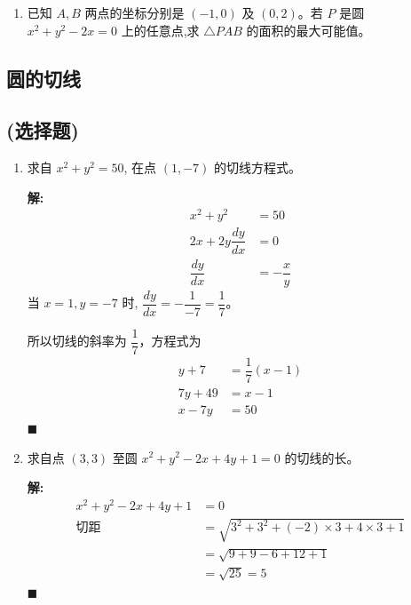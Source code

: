 \documentclass[10pt]{article}
\newcommand{\sol}{\textbf{解:} }
\begin{document}
\begin{enumerate}[leftmargin=*]
  \item 已知 $A, B$ 两点的坐标分别是 $(-1,0)$ 及 $(0,2)$。若 $P$ 是圆 $x^{2}+y^{2}-2 x=0$ 上的任意点,求 $\triangle P A B$ 的面积的最大可能值。

\end{enumerate}

\newpage
\subsection{圆的切线}
\subsection*{(选择题)}

\begin{enumerate}[leftmargin=*]
  \item 求自 $x^{2}+y^{2}=50$, 在点 $(1,-7)$ 的切线方程式。

        \sol{}
        \begin{align*}
          x^{2}+y^{2}          & = 50            \\
          2x+2y \dfrac{dy}{dx} & = 0             \\
          \dfrac{dy}{dx}       & = -\dfrac{x}{y}
        \end{align*}
        当 $x = 1, y = -7$ 时, $\dfrac{dy}{dx} = -\dfrac{1}{-7} = \dfrac{1}{7}$。

        所以切线的斜率为 $\dfrac{1}{7}$，方程式为
        \begin{align*}
          y+7     & = \dfrac{1}{7}(x-1) \\
          7y + 49 & = x - 1             \\
          x - 7y  & = 50
        \end{align*} \hfill$\blacksquare$

  \item 求自点 $(3,3)$ 至圆 $x^{2}+y^{2}-2 x+4 y+1=0$ 的切线的长。

        \sol{}
        \begin{align*}
          x^{2}+y^{2}-2 x+4 y+1 & = 0                                                 \\
          \text{切距}             & = \sqrt{3^2 + 3^2 + (-2) \times 3 + 4 \times 3 + 1} \\
                                & = \sqrt{9 + 9 - 6 + 12 + 1}                         \\
                                & = \sqrt{25} = 5
        \end{align*} \hfill$\blacksquare$


\end{enumerate}
\end{document}
